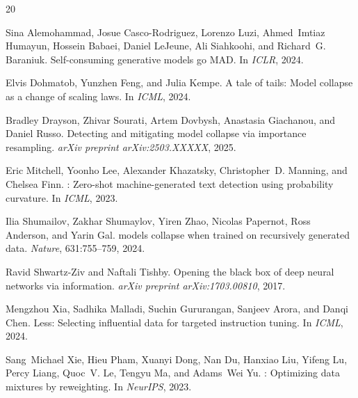 \documentclass[11pt,a4paper]{article}
\begin{document}

\begin{thebibliography}{20}

Sina Alemohammad, Josue Casco-Rodriguez, Lorenzo Luzi, Ahmed~Imtiaz Humayun, Hossein Babaei, Daniel LeJeune, Ali Siahkoohi, and Richard~G. Baraniuk.
\newblock Self-consuming generative models go {MAD}.
\newblock In \emph{ICLR}, 2024.

Elvis Dohmatob, Yunzhen Feng, and Julia Kempe.
\newblock A tale of tails: Model collapse as a change of scaling laws.
\newblock In \emph{ICML}, 2024.

Bradley Drayson, Zhivar Sourati, Artem Dovbysh, Anastasia Giachanou, and Daniel Russo.
\newblock Detecting and mitigating model collapse via importance resampling.
\newblock \emph{arXiv preprint arXiv:2503.XXXXX}, 2025.

Eric Mitchell, Yoonho Lee, Alexander Khazatsky, Christopher~D. Manning, and Chelsea Finn.
: Zero-shot machine-generated text detection using probability curvature.
\newblock In \emph{ICML}, 2023.

Ilia Shumailov, Zakhar Shumaylov, Yiren Zhao, Nicolas Papernot, Ross Anderson, and Yarin Gal.
 models collapse when trained on recursively generated data.
\newblock \emph{Nature}, 631:755--759, 2024.

Ravid Shwartz-Ziv and Naftali Tishby.
\newblock Opening the black box of deep neural networks via information.
\newblock \emph{arXiv preprint arXiv:1703.00810}, 2017.

Mengzhou Xia, Sadhika Malladi, Suchin Gururangan, Sanjeev Arora, and Danqi Chen.
\newblock Less: Selecting influential data for targeted instruction tuning.
\newblock In \emph{ICML}, 2024.

Sang~Michael Xie, Hieu Pham, Xuanyi Dong, Nan Du, Hanxiao Liu, Yifeng Lu, Percy Liang, Quoc~V. Le, Tengyu Ma, and Adams~Wei Yu.
: Optimizing data mixtures by reweighting.
\newblock In \emph{NeurIPS}, 2023.

\end{thebibliography}
\end{document}
